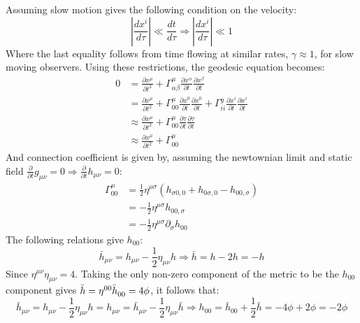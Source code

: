 \documentclass[12pt,a4]{article}
\begin{document}
\begin{enumerate}
\begin{enumerate}
        Assuming slow motion gives the following condition on the velocity:
        \begin{equation*}
          \left|\frac{d x^i}{d \tau}\right| \ll \frac{d t}{d \tau} \Rightarrow \left|\frac{d x^i}{d \tau}\right| \ll 1
        \end{equation*}
        Where the last equality follows from time flowing at similar rates, $\gamma \approx 1$, for slow moving observers.
        Using these restrictions, the geodesic equation becomes:
        \begin{align*}
          0 &= \frac{\partial x^\mu}{\partial t^2} + \Gamma^\mu_{\alpha \beta} \frac{\partial x^\alpha}{\partial t} \frac{\partial x^\beta}{\partial t} \\
            &= \frac{\partial x^\mu}{\partial t^2} + \Gamma^\mu_{00} \frac{\partial x^0}{\partial t} \frac{\partial x^0}{\partial t} + \Gamma^y_{ii} \frac{\partial x^i}{\partial t} \frac{\partial x^i}{\partial t}\\
            &\approx \frac{\partial x^\mu}{\partial t^2} + \Gamma^\mu_{00} \frac{\partial \tau}{\partial t} \frac{\partial \tau}{\partial t} \\
            &\approx \frac{\partial x^\mu}{\partial t^2} + \Gamma^\mu_{00} 
        \end{align*}
        And connection coefficient is given by, assuming the newtownian limit and static field $\frac{\partial}{\partial t} g_{\mu\nu} = 0 \Rightarrow \frac{\partial}{\partial t} h_{\mu\nu} = 0$:
        \begin{align*}
          \Gamma^\mu_{0 0} &= \frac{1}{2} \eta^{\mu \sigma} (h_{\sigma 0, 0} + h_{0\sigma, 0} - h_{0 0, \sigma})\\
                           &= - \frac{1}{2}  \eta^{\mu \sigma}  h_{0 0, \sigma}\\
                           &= - \frac{1}{2}  \eta^{\mu \sigma}\partial_\sigma  h_{0 0}
        \end{align*}
        The following relations give $h_{00}$:
        \begin{equation*}
          \bar{h}_{\mu\nu} = h_{\mu\nu} - \frac{1}{2}\eta_{\mu\nu}h \Rightarrow \bar{h} =  h - 2 h = - h
        \end{equation*}
        Since $\eta^{\mu\nu}\eta_{\mu\nu} = 4$.
        Taking the only non-zero component of the metric to be the $h_{00}$ component gives $\bar{h} = \eta^{00}\tensor{\bar{h}}{_0_0}  = 4 \phi$,
        it follows that:
        \begin{equation*}
          \bar{h}_{\mu\nu} = h_{\mu\nu} - \frac{1}{2}\eta_{\mu\nu}h = h_{\mu \nu} = \bar{h}_{\mu\nu} - \frac{1}{2}\eta_{\mu\nu} \bar{h} \Rightarrow h_{00} = \bar{h}_{00} + \frac{1}{2} \bar{h} = -4 \phi + 2 \phi = -2 \phi

\end{equation*}
\end{enumerate}
\end{enumerate}
\end{document}
